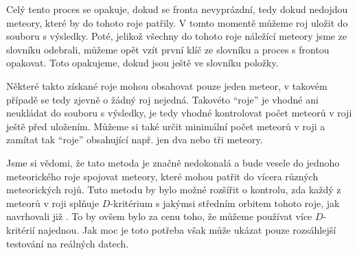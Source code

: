 Celý tento proces se opakuje, dokud se fronta nevyprázdní, tedy dokud nedojdou meteory, které by do tohoto roje patřily. V tomto momentě můžeme roj uložit do souboru s výsledky. Poté, jelikož všechny do tohoto roje náležící meteory jsme ze slovníku odebrali, můžeme opět vzít první klíč ze slovníku a proces s frontou opakovat. Toto opakujeme, dokud jsou ještě ve slovníku položky.

\smallskip

Některé takto získané roje mohou obsahovat pouze jeden meteor, v takovém případě se tedy zjevně o žádný roj nejedná. Takovéto "`roje"' je vhodné ani neukládat do souboru s výsledky, je tedy vhodné kontrolovat počet meteorů v roji ještě před uložením. Můžeme si také určit minimální počet meteorů v roji a zamítat tak "`roje"' obsahující např. jen dva nebo tři meteory.

\medskip

Jsme si vědomi, že tato metoda je značně nedokonalá a bude vesele do jednoho meteorického roje spojovat meteory, které mohou patřit do vícera různých meteorických rojů. Tuto metodu by bylo možné rozšířit o kontrolu, zda každý z meteorů v roji splňuje $D$-kritérium s jakýmsi středním orbitem tohoto roje, jak navrhovali již \citeauthor{dsh}. To by ovšem bylo za cenu toho, že můžeme používat více $D$-kritérií najednou. Jak moc je toto potřeba však může ukázat pouze rozsáhlejší testování na reálných datech.
